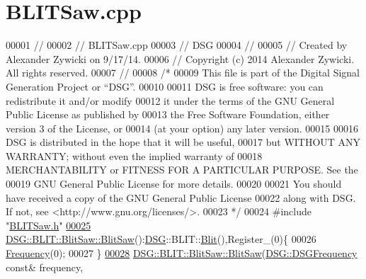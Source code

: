 \hypertarget{_b_l_i_t_saw_8cpp_source}{\section{B\+L\+I\+T\+Saw.\+cpp}
\label{_b_l_i_t_saw_8cpp_source}
}

\begin{DoxyCode}
00001 \textcolor{comment}{//}
00002 \textcolor{comment}{//  BLITSaw.cpp}
00003 \textcolor{comment}{//  DSG}
00004 \textcolor{comment}{//}
00005 \textcolor{comment}{//  Created by Alexander Zywicki on 9/17/14.}
00006 \textcolor{comment}{//  Copyright (c) 2014 Alexander Zywicki. All rights reserved.}
00007 \textcolor{comment}{//}
00008 \textcolor{comment}{/*}
00009 \textcolor{comment}{ This file is part of the Digital Signal Generation Project or “DSG”.}
00010 \textcolor{comment}{}
00011 \textcolor{comment}{ DSG is free software: you can redistribute it and/or modify}
00012 \textcolor{comment}{ it under the terms of the GNU General Public License as published by}
00013 \textcolor{comment}{ the Free Software Foundation, either version 3 of the License, or}
00014 \textcolor{comment}{ (at your option) any later version.}
00015 \textcolor{comment}{}
00016 \textcolor{comment}{ DSG is distributed in the hope that it will be useful,}
00017 \textcolor{comment}{ but WITHOUT ANY WARRANTY; without even the implied warranty of}
00018 \textcolor{comment}{ MERCHANTABILITY or FITNESS FOR A PARTICULAR PURPOSE.  See the}
00019 \textcolor{comment}{ GNU General Public License for more details.}
00020 \textcolor{comment}{}
00021 \textcolor{comment}{ You should have received a copy of the GNU General Public License}
00022 \textcolor{comment}{ along with DSG.  If not, see <http://www.gnu.org/licenses/>.}
00023 \textcolor{comment}{ */}
00024 \textcolor{preprocessor}{#include "\hyperlink{_b_l_i_t_saw_8h}{BLITSaw.h}"}
\hypertarget{_b_l_i_t_saw_8cpp_source_l00025}{}\hyperlink{class_d_s_g_1_1_b_l_i_t_1_1_blit_saw_a5c73a4aeb4df74da4db4896edeb15059}{00025} \hyperlink{class_d_s_g_1_1_b_l_i_t_1_1_blit_saw_a5c73a4aeb4df74da4db4896edeb15059}{DSG::BLIT::BlitSaw::BlitSaw}():\hyperlink{namespace_d_s_g}{DSG}::BLIT::\hyperlink{class_d_s_g_1_1_b_l_i_t_1_1_blit}{Blit}(),Register\_(0)\{
00026     \hyperlink{class_d_s_g_1_1_signal_generator_a4e6b3c43e76e53f8cd337ad699c464cb}{Frequency}(0);
00027 \}
\hypertarget{_b_l_i_t_saw_8cpp_source_l00028}{}\hyperlink{class_d_s_g_1_1_b_l_i_t_1_1_blit_saw_a3d7e4379c00970fa89085ed2c945a2b7}{00028} \hyperlink{class_d_s_g_1_1_b_l_i_t_1_1_blit_saw_a5c73a4aeb4df74da4db4896edeb15059}{DSG::BLIT::BlitSaw::BlitSaw}(\hyperlink{namespace_d_s_g_a4315a061386fa1014fda09b15d3a6973}{DSG::DSGFrequency} \textcolor{keyword}{const}& frequency,

\end{DoxyCode}
